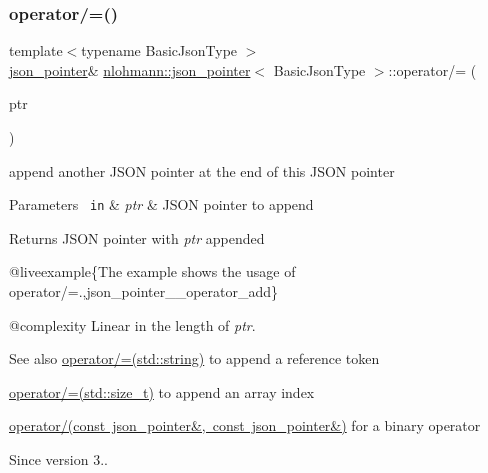 \subsubsection{\texorpdfstring{operator/=()}{operator/=()}\hspace{0.1cm}{\footnotesize\ttfamily [1/3]}}
{\footnotesize\ttfamily template$<$typename Basic\+Json\+Type $>$ \\
\mbox{\hyperlink{classnlohmann_1_1json__pointer}{json\+\_\+pointer}}\& \mbox{\hyperlink{classnlohmann_1_1json__pointer}{nlohmann\+::json\+\_\+pointer}}$<$ Basic\+Json\+Type $>$\+::operator/= (\begin{DoxyParamCaption}\item[{const \mbox{\hyperlink{classnlohmann_1_1json__pointer}{json\+\_\+pointer}}$<$ Basic\+Json\+Type $>$ \&}]{ptr }\end{DoxyParamCaption})\hspace{0.3cm}{\ttfamily [inline]}}



append another J\+S\+ON pointer at the end of this J\+S\+ON pointer 


\begin{DoxyParams}[1]{Parameters}
\mbox{\texttt{ in}}  & {\em ptr} & J\+S\+ON pointer to append \\
\hline
\end{DoxyParams}
\begin{DoxyReturn}{Returns}
J\+S\+ON pointer with {\itshape ptr} appended
\end{DoxyReturn}
@liveexample\{The example shows the usage of {\ttfamily operator/=}.,json\+\_\+pointer\+\_\+\+\_\+operator\+\_\+add\}

@complexity Linear in the length of {\itshape ptr}.

\begin{DoxySeeAlso}{See also}
\mbox{\hyperlink{classnlohmann_1_1json__pointer_abdd21567b2b1d69329af0f520335e68b}{operator/=(std\+::string)}} to append a reference token 

\mbox{\hyperlink{classnlohmann_1_1json__pointer_a64c8401529131bad1e486d91d703795f}{operator/=(std\+::size\+\_\+t)}} to append an array index 

\mbox{\hyperlink{classnlohmann_1_1json__pointer_a90a11fe6c7f37b1746a3ff9cb24b0d53}{operator/(const json\+\_\+pointer\&, const json\+\_\+pointer\&)}} for a binary operator
\end{DoxySeeAlso}
\begin{DoxySince}{Since}
version 3.. 
\end{DoxySince}


